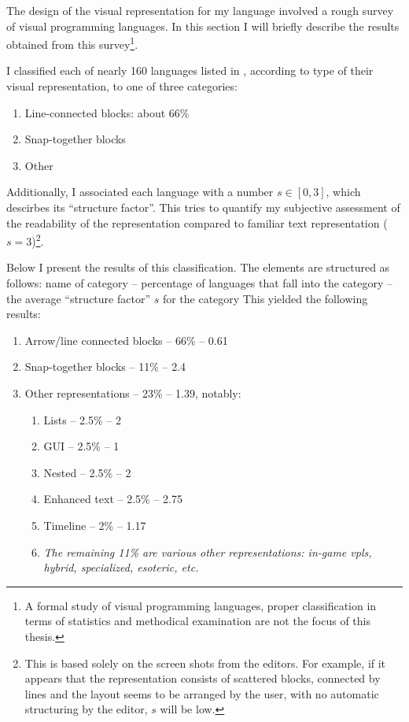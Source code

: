 The design of the visual representation for my language involved a rough survey
of visual programming languages. In this section I will briefly describe the
results obtained from this survey\footnote{A formal study of visual programming
  languages, proper classification in terms of statistics and methodical
  examination are not the focus of this thesis. }.

I classified each of nearly 160 languages listed in \cite{snapshots}, according
to type of their visual representation, to one of three categories:
\begin{enumerate}
    \item Line-connected blocks: about 66\%
    \item Snap-together blocks
    \item Other
\end{enumerate}

Additionally, I associated each language with a number $s \in [0, 3]$, which
descirbes its ``structure factor''. This tries to quantify my subjective
assessment of the readability of the representation compared to familiar text
representation ($s = 3$)\footnote{This is based solely on the screen shots from
  the editors. For example, if it appears that the representation consists of
  scattered blocks, connected by lines and the layout seems to be arranged by
  the user, with no automatic structuring by the editor, $s$ will be low.}.

Below I present the results of this classification. The elements are structured
as follows: name of category -- percentage of languages that fall into the
category -- the average ``structure factor'' $s$ for the category This yielded
the following results:
\begin{enumerate}
    \item Arrow/line connected blocks -- 66\% -- 0.61
    \item Snap-together blocks -- 11\% -- 2.4
    \item Other representations -- 23\% -- 1.39, notably:
    \begin{enumerate}
        \item Lists -- 2.5\% -- 2
        \item GUI -- 2.5\% -- 1
        \item Nested -- 2.5\% -- 2
        \item Enhanced text -- 2.5\% -- 2.75
        \item Timeline -- 2\% -- 1.17
        \item \textit{The remaining 11\% are various other representations:
          in-game \acrshort{vpl}s, hybrid, specialized, esoteric, etc.}
    \end{enumerate}
\end{enumerate}

